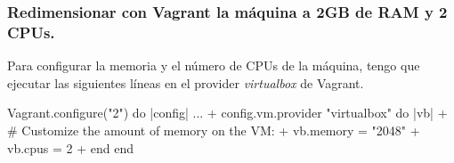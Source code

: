 \subsubsection{Redimensionar con Vagrant la máquina a 2GB de RAM y 2 CPUs.}
\par Para configurar la memoria y el número de CPUs de la máquina, tengo que ejecutar las 
siguientes líneas en el provider \textit{virtualbox} de Vagrant.
\begin{listing}
    Vagrant.configure("2") do |config|
        ...
  +     config.vm.provider "virtualbox" do |vb|
  +         # Customize the amount of memory on the VM:
  +         vb.memory = "2048"
  +         vb.cpus = 2
  +     end
    end
\end{listing}

